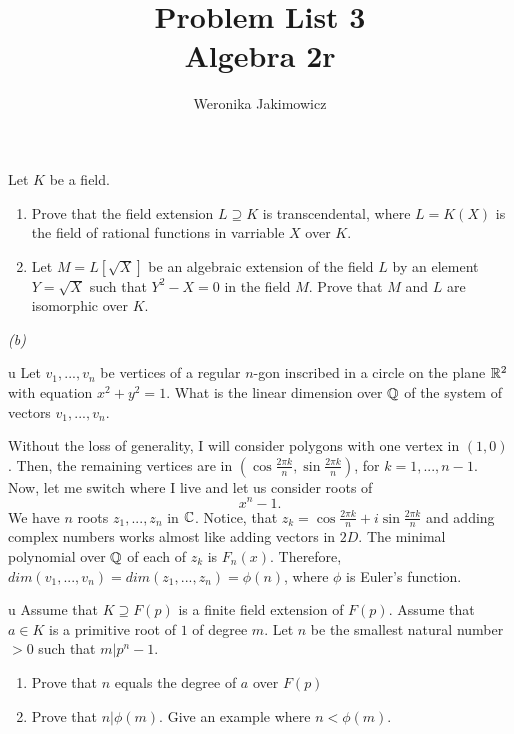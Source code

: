 \documentclass{article}
\title{Problem List 3\smallskip\\{\normalsize Algebra 2r}}
\author{Weronika Jakimowicz}
\date{}
\begin{document}
\maketitle
\thispagestyle{empty}

\begin{problem}[1]{}
Let $K$ be a field.
\begin{enumerate}[label=(\alph*)]
    \item Prove that the field extension $L\supseteq K$ is transcendental, where $L=K(X)$ is the field of rational functions in varriable $X$ over $K$.
    \item Let $M=L[\sqrt{X}]$ be an algebraic extension of the field $L$ by an element $Y=\sqrt{X}$ such that $Y^2-X=0$ in the field $M$. Prove that $M$ and $L$ are isomorphic over $K$.
\end{enumerate}
\end{problem}

\emph{(b)}

\begin{center}
\end{center}

\begin{problem}[3]{u}
Let $v_1,...,v_n$ be vertices of a regular $n$-gon inscribed in a circle on the plane $\mathbb{R}^2$ with equation $x^2+y^2=1$. What is the linear dimension over $\mathbb{Q}$ of the system of vectors $v_1,...,v_n$.
\end{problem}

Without the loss of generality, I will consider polygons with one vertex in $(1, 0)$. Then, the remaining vertices are in $(\cos\frac{2\pi k}{n},\sin\frac{2\pi k}{n})$, for $k=1,...,n-1$. Now, let me switch where I live and let us consider roots of
$$x^n-1.$$
We have $n$ roots $z_1,...,z_n$ in $\mathbb{C}$. Notice, that $z_k=\cos\frac{2\pi k}{n}+i\sin\frac{2\pi k}{n}$ and adding complex numbers works almost like adding vectors in $2D$. The minimal polynomial over $\mathbb{Q}$ of each of $z_k$ is $F_n(x)$. Therefore, $dim(v_1,...,v_n)=dim(z_1,...,z_n)=\phi(n)$, where $\phi$ is Euler's function.

\begin{problem}[4]{u}
    Assume that $K\supseteq F(p)$ is a finite field extension of $F(p)$. Assume that $a\in K$ is a primitive root of $1$ of degree $m$. Let $n$ be the smallest natural number $>0$ such that $m|p^n-1$.
    \begin{enumerate}[label=(\alph*)]
        \item Prove that $n$ equals the degree of $a$ over $F(p)$
        \item Prove that $n|\phi(m)$. Give an example where $n<\phi(m)$.
    \end{enumerate}
\end{problem}
\end{document}
